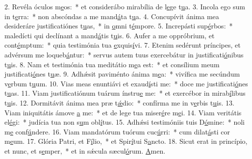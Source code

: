 2. Revéla óculos m\uline{e}os:~* et considerábo mirabília de l\uline{e}ge t\uline{u}a.
3. Incola ego sum in t\uline{e}rra:~* non abscóndas a me mand\uline{á}ta t\uline{u}a.
4. Concupívit ánima mea desideráre justificatiónes t\uline{u}as,~* in \uline{o}mni t\uline{é}mpore.
5. Increpásti sup\uline{é}rbos:~* maledícti qui declínant a mand\uline{á}tis t\uline{u}is.
6. Aufer a me oppróbrium, et cont\uline{é}mptum:~* quia testimónia tua \uline{e}xquis\uline{í}vi.
7. Etenim sedérunt príncipes, et advérsum me loqueb\uline{á}ntur:~* servus autem tuus exercebátur in justificati\uline{ó}nibus t\uline{u}is.
8. Nam et testimónia tua meditátio m\uline{e}a est:~* et consílium meum justificati\uline{ó}nes t\uline{u}æ.
9. Adhǽsit paviménto ánima m\uline{e}a:~* vivífica me secúndum v\uline{e}rbum t\uline{u}um.
10. Vias meas enuntiávi et exaud\uline{í}sti me:~* doce me justificati\uline{ó}nes t\uline{u}as.
11. Viam justificatiónum tuárum ínstru\uline{e} me:~* et exercébor in mirab\uline{í}libus t\uline{u}is.
12. Dormitávit ánima mea præ t\uline{ǽ}dio:~* confírma me in v\uline{e}rbis t\uline{u}is.
13. Viam iniquitátis ámove \uline{a} me:~* et de lege tua miser\uline{é}re m\uline{e}i.
14. Viam veritátis el\uline{é}gi:~* judícia tua non s\uline{u}m obl\uline{í}tus.
15. Adhǽsi testimóniis tuis D\uline{ó}mine:~* noli m\uline{e} conf\uline{ú}ndere.
16. Viam mandatórum tuórum cuc\uline{ú}rri:~* cum dilat\uline{á}sti cor m\uline{e}um.
17. Glória Patri, et F\uline{í}lio,~* et Spir\uline{í}tui S\uline{a}ncto.
18. Sicut erat in princípio, et nunc, et s\uline{e}mper,~* et in sǽcula sæcul\uline{ó}rum. \uline{A}men.
